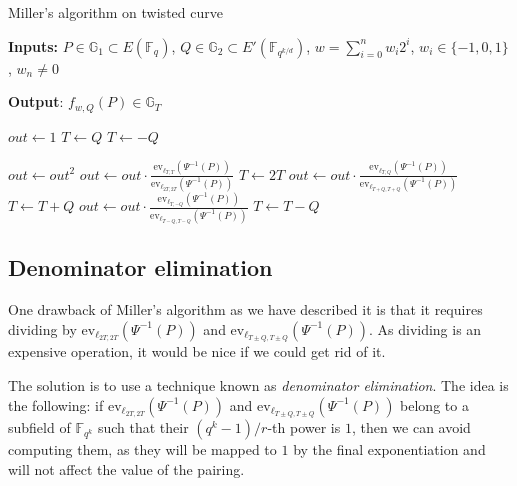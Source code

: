 \documentclass{article}
\newcommand{\gOne}{\mathbb{G}_1}
\newcommand{\gTwo}{\mathbb{G}_2}
\newcommand{\gT}{\mathbb{G}_T}
\newcommand{\ev}{\mathrm{ev}}
\newcommand{\fq}[1]{\mathbb{F}_{q^{#1}}}
\theoremstyle{remark}
\theoremstyle{plain}
\begin{document}
\begin{algorithm}
    \label{alg:millerOnTwistedCurve}
    \caption{\small Miller's algorithm on twisted curve}\label{alg:millerAlgorithWithTwistedCurve}
    \textbf{Inputs:} $P \in \gOne \subset E(\fq{})$, $Q \in \gTwo \subset E'(\fq{k/d})$, $w = \sum_{i=0}^n w_i 2^i$, $w_i \in \{-1,0,1\}$, $w_n \neq 0$

    \textbf{Output}: $f_{w,Q}(P) \in \gT$
    \begin{algorithmic}
        \State $out \gets 1$
            \State $T \gets Q$
        \Else
            \State $T \gets -Q$
        \EndIf

        \State $out \gets out^2$
        \State $out \gets out \cdot \frac{\ev_{\ell_{T,T}}(\Psi^{-1}(P))}{\ev_{\ell_{2T,2T}}(\Psi^{-1}(P))}$
        \State $T \gets 2T$
            \State $out \gets out \cdot \frac{\ev_{\ell_{T,Q}}(\Psi^{-1}(P))}{\ev_{\ell_{T+Q,T+Q}}(\Psi^{-1}(P))}$
            \State $T \gets T + Q$
        \Else
            \State $out \gets out \cdot \frac{\ev_{\ell_{T,-Q}}(\Psi^{-1}(P))}{\ev_{\ell_{T-Q,T-Q}}(\Psi^{-1}(P))}$
            \State $T \gets T - Q$
        \EndIf
        \EndFor
    \end{algorithmic}
\end{algorithm}

\subsection{Denominator elimination}

One drawback of Miller's algorithm as we have described it is that it requires dividing by $\ev_{\ell_{2T, 2T}}(\Psi^{-1}(P))$ and $\ev_{\ell_{T \pm Q, T \pm Q}}(\Psi^{-1}(P))$.
As dividing is an expensive operation, it would be nice if we could get rid of it.

The solution is to use a technique known as \emph{denominator elimination}.
The idea is the following: if $\ev_{\ell_{2T, 2T}}(\Psi^{-1}(P))$ and $\ev_{\ell_{T \pm Q, T \pm Q}}(\Psi^{-1}(P))$ belong to a subfield of $\fq{k}$ such that their $(q^k - 1)/r$-th power is $1$, then we can avoid computing them, as they will be mapped to $1$ by the final exponentiation and will not affect the value of the pairing.
\end{document}
